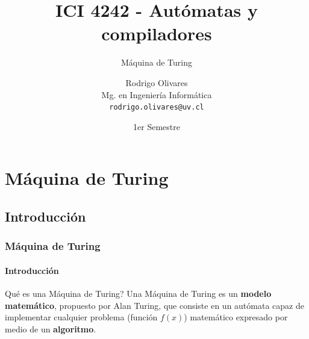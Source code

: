 \documentclass{beamer}
\title[\textbf{ICI 4242 - Aut\'omatas y compiladores}]{\textbf{ICI 4242 - Aut\'omatas y compiladores}}
\subtitle{M\'aquina de Turing}
\author[Rodrigo Olivares]
{
	Rodrigo Olivares \\
	\vspace{0.5mm}
	Mg. en Ingenier\'ia Inform\'atica \\
	\vspace{0.5mm}
	\texttt{\normalsize rodrigo.olivares@uv.cl}
}
\institute[PUCV]
\date{1er Semestre}
\begin{document}
	\begin{frame}
		\titlepage
	\end{frame}


	\section{M\'aquina de Turing}

		\subsection{Introducci\'on}

        \begin{frame}
            \frametitle{M\'aquina de Turing}
            \framesubtitle{Introducci\'on}

            \begin{exampleblock}{\textquestiondown Qu\'e es una M\'aquina de Turing?}
                Una M\'aquina de Turing es un \textbf{modelo matem\'atico}, propuesto por Alan Turing, que consiste en un aut\'omata capaz de implementar cualquier problema (funci\'on $f(x)$) matem\'atico expresado por medio de un \textbf{algoritmo}.
			\end{exampleblock}
		\end{frame}
\end{document}
